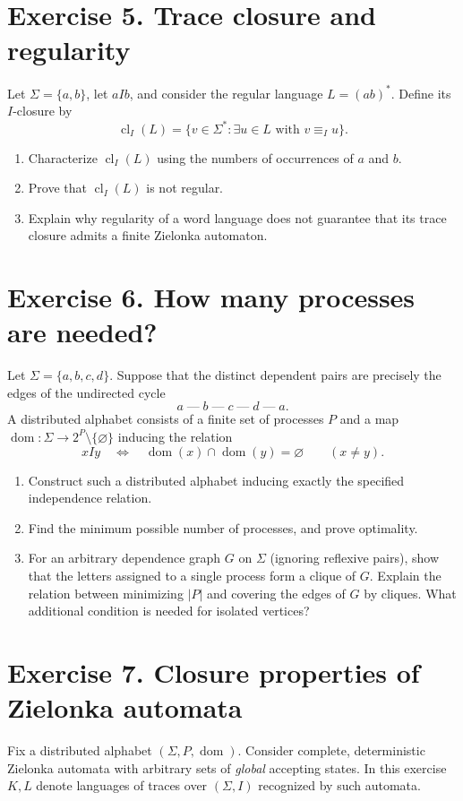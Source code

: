 \documentclass[10pt,a4paper]{article}
\newcommand{\dom}{\operatorname{dom}}
\newcommand{\cl}{\operatorname{cl}}
\begin{document}
\section*{Exercise 5. Trace closure and regularity}
Let $\Sigma=\{a,b\}$, let $aIb$, and consider the regular language
$L=(ab)^*$. Define its $I$-closure by
\[
    \cl_I(L)=\{v\in\Sigma^*:\exists u\in L\text{ with }v\equiv_I u\}.
\]
\begin{enumerate}
\item Characterize $\cl_I(L)$ using the numbers of occurrences of $a$
      and $b$.
\item Prove that $\cl_I(L)$ is not regular.
\item Explain why regularity of a word language does not guarantee
      that its trace closure admits a finite Zielonka automaton.
\end{enumerate}

\section*{Exercise 6. How many processes are needed?}
Let $\Sigma=\{a,b,c,d\}$. Suppose that the distinct dependent pairs are
precisely the edges of the undirected cycle
\[
              a\;\text{---}\;b\;\text{---}\;c\;\text{---}\;d\;\text{---}\;a.
\]
A distributed alphabet consists of a finite set of processes $P$ and a map
$\dom:\Sigma\to 2^P\setminus\{\varnothing\}$ inducing the relation
\[
       xIy \quad\Longleftrightarrow\quad
       \dom(x)\cap\dom(y)=\varnothing
       \qquad(x\ne y).
\]
\begin{enumerate}
\item Construct such a distributed alphabet inducing exactly the
      specified independence relation.
\item Find the minimum possible number of processes, and prove
      optimality.
\item For an arbitrary dependence graph $G$ on $\Sigma$ (ignoring
      reflexive pairs), show that the letters assigned to a single
      process form a clique of $G$. Explain the relation between
      minimizing $|P|$ and covering the edges of $G$ by cliques.
      What additional condition is needed for isolated vertices?
\end{enumerate}

\section*{Exercise 7. Closure properties of Zielonka automata}
Fix a distributed alphabet $(\Sigma,P,\dom)$. Consider complete,
deterministic Zielonka automata with arbitrary sets of \emph{global}
accepting states. In this exercise $K,L$ denote languages of traces over
$(\Sigma,I)$ recognized by such automata.
\end{document}
